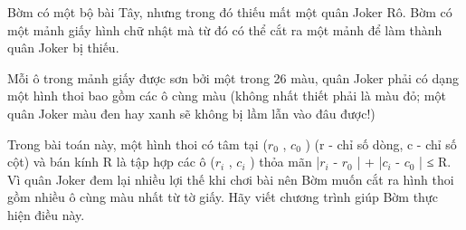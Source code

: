 Bờm có một bộ bài Tây, nhưng trong đó thiếu mất một quân Joker Rô. Bờm có một mảnh giấy hình chữ nhật mà từ đó có thể cắt ra một mảnh để làm thành quân Joker bị thiếu.  

   Mỗi ô trong mảnh giấy được sơn bởi một trong 26 màu, quân Joker phải có dạng một hình thoi bao gồm các ô cùng màu (không nhất thiết phải là màu đỏ; một quân Joker màu đen hay xanh sẽ không bị lầm lẫn vào đâu được!)  

   Trong bài toán này, một hình thoi có tâm tại ($r_{0}$   , $c_{0}$   ) (r - chỉ số dòng, c - chỉ số cột) và bán kính R là tập hợp các ô ($r_{i}$   , $c_{i}$   ) thỏa mãn |$r_{i}$   - $r_{0}$   | + |$c_{i}$   - $c_{0}$   | ≤ R. Vì quân Joker đem lại nhiều lợi thế khi chơi bài nên Bờm muốn cắt ra hình thoi gồm nhiều ô cùng màu nhất từ tờ giấy. Hãy viết chương trình giúp Bờm thực hiện điều này.